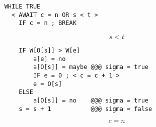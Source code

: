 \documentclass{article}
\begin{document}
\begin{verbatim}
    WHILE TRUE
      < AWAIT c = n OR s < t >
        IF c = n ; BREAK
\end{verbatim}
\begin{displaymath}
s < t
\end{displaymath}
\begin{verbatim}
        IF W[O[s]] > W[e]
            a[e] = no
            a[O[s]] = maybe @@@ sigma = true
            IF e = 0 ; < c = c + 1 >
            e = O[s]
        ELSE
            a[O[s]] = no    @@@ sigma = true
        s = s + 1           @@@ sigma = false
\end{verbatim}
\begin{displaymath}
c = n
\end{displaymath}
\end{document}
